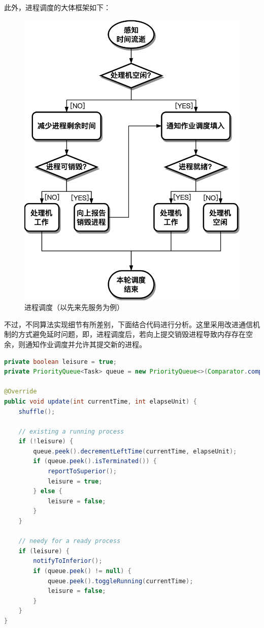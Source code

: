 \documentclass[12pt, a4paper, UTF8]{ctexart}
\begin{document}
此外，进程调度的大体框架如下：
\begin{figure}[htbp]
    \centering
    \includegraphics{i-process-fcfs.png}
    \caption{进程调度（以先来先服务为例）}
\end{figure}

不过，不同算法实现细节有所差别，下面结合代码进行分析。这里采用改进通信机制的方式避免延时问题，即，进程调度后，若向上提交销毁进程导致内存存在空余，则通知作业调度并允许其提交新的进程。

\begin{lstlisting}[language={java},caption={先来先服务}]
private boolean leisure = true;
private PriorityQueue<Task> queue = new PriorityQueue<>(Comparator.comparingInt(Task::getProcessArriveTime));

@Override
public void update(int currentTime, int elapseUnit) {
    shuffle();

    // existing a running process
    if (!leisure) {
        queue.peek().decrementLeftTime(currentTime, elapseUnit);
        if (queue.peek().isTerminated()) {
            reportToSuperior();
            leisure = true;
        } else {
            leisure = false;
        }
    }

    // needy for a ready process
    if (leisure) {
        notifyToInferior();
        if (queue.peek() != null) {
            queue.peek().toggleRunning(currentTime);
            leisure = false;
        }
    }
}
\end{lstlisting}
\end{document}
